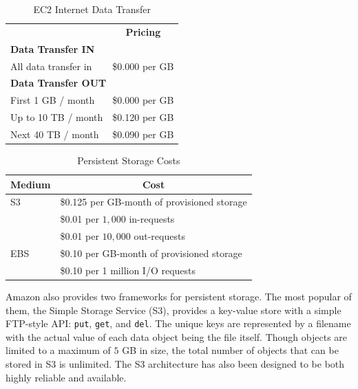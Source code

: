 \begin{table}[htp]
  \begin{center}
    \begin{tabular}{|l | c|}
      \hline
      \multicolumn{1}{|c}{} & \textbf{Pricing} \\
      \multicolumn{2}{|l|}{\textbf{Data Transfer IN}} \\
      \hline
      All data transfer in & \$0.000 per GB \\
      \hline
      \multicolumn{2}{|l|}{\textbf{Data Transfer OUT}} \\
      \hline
             First 1 GB / month & \$0.000 per GB\\
            Up to 10 TB / month & \$0.120 per GB\\
             Next 40 TB / month & \$0.090 per GB\\
      \hline
    \end{tabular}
    \caption{EC2 Internet Data Transfer}
    \label{tab:costs_ec2_transfer}
  \end{center}
\end{table}

\begin{table}[htp]
  \begin{center}
    \begin{tabular}{|l | l|}
      \hline
      \textbf{Medium} & \multicolumn{1}{c|}{\textbf{Cost}} \\
      \hline
      S3 & \$0.125 per GB-month of provisioned storage\\
         & \$0.01 per $1,000$ in-requests\\
         & \$0.01 per $10,000$ out-requests\\
      \hline
     EBS & \$0.10 per GB-month of provisioned storage\\
         & \$0.10 per 1 million I/O requests\\
      \hline
    \end{tabular}
  \end{center}
  \caption{Persistent Storage Costs}
  \label{tab:costs_persistent}
\end{table}

Amazon also provides two frameworks for persistent storage. The most popular of
them, the Simple Storage Service (S3), provides a key-value store with a simple
FTP-style API: {\tt put}, {\tt get}, and {\tt del}. The unique keys are
represented by a filename with the actual value of each data object being the
file itself. Though objects are limited to a maximum of $5$ GB in size, the
total number of objects that can be stored in S3 is unlimited. The S3
architecture has also been designed to be both highly reliable and available.

